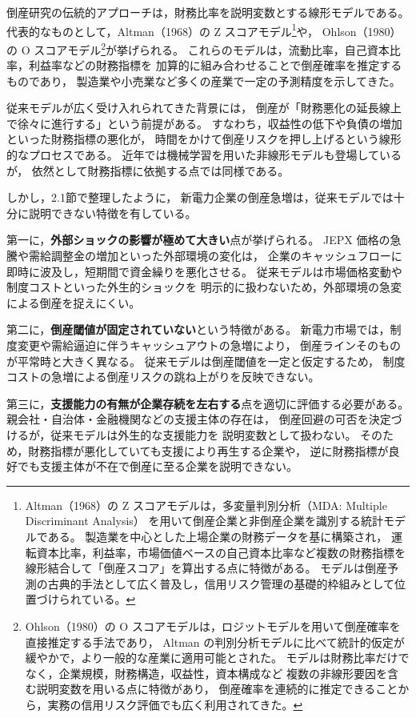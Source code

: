 倒産研究の伝統的アプローチは，財務比率を説明変数とする線形モデルである。
代表的なものとして，Altman（1968）の Z スコアモデル\footnote{
Altman（1968）の Z スコアモデルは，多変量判別分析（MDA: Multiple Discriminant Analysis）
を用いて倒産企業と非倒産企業を識別する統計モデルである。
製造業を中心とした上場企業の財務データを基に構築され，
運転資本比率，利益率，市場価値ベースの自己資本比率など複数の財務指標を
線形結合して「倒産スコア」を算出する点に特徴がある。
モデルは倒産予測の古典的手法として広く普及し，信用リスク管理の基礎的枠組みとして位置づけられている。
}や，
Ohlson（1980）の O スコアモデル\footnote{
Ohlson（1980）の O スコアモデルは，ロジットモデルを用いて倒産確率を直接推定する手法であり，
Altman の判別分析モデルに比べて統計的仮定が緩やかで，より一般的な産業に適用可能とされた。
モデルは財務比率だけでなく，企業規模，財務構造，収益性，資本構成など
複数の非線形要因を含む説明変数を用いる点に特徴があり，
倒産確率を連続的に推定できることから，実務の信用リスク評価でも広く利用されてきた。
}が挙げられる。
これらのモデルは，流動比率，自己資本比率，利益率などの財務指標を
加算的に組み合わせることで倒産確率を推定するものであり，
製造業や小売業など多くの産業で一定の予測精度を示してきた。


従来モデルが広く受け入れられてきた背景には，
倒産が「財務悪化の延長線上で徐々に進行する」という前提がある。
すなわち，収益性の低下や負債の増加といった財務指標の悪化が，
時間をかけて倒産リスクを押し上げるという線形的なプロセスである。
近年では機械学習を用いた非線形モデルも登場しているが，
依然として財務指標に依拠する点では同様である。

しかし，2.1節で整理したように，
新電力企業の倒産急増は，従来モデルでは十分に説明できない特徴を有している。

第一に，\textbf{外部ショックの影響が極めて大きい}点が挙げられる。
JEPX 価格の急騰や需給調整金の増加といった外部環境の変化は，
企業のキャッシュフローに即時に波及し，短期間で資金繰りを悪化させる。
従来モデルは市場価格変動や制度コストといった外生的ショックを
明示的に扱わないため，外部環境の急変による倒産を捉えにくい。

第二に，\textbf{倒産閾値が固定されていない}という特徴がある。
新電力市場では，制度変更や需給逼迫に伴うキャッシュアウトの急増により，
倒産ラインそのものが平常時と大きく異なる。
従来モデルは倒産閾値を一定と仮定するため，
制度コストの急増による倒産リスクの跳ね上がりを反映できない。

第三に，\textbf{支援能力の有無が企業存続を左右する}点を適切に評価する必要がある。
親会社・自治体・金融機関などの支援主体の存在は，
倒産回避の可否を決定づけるが，従来モデルは外生的な支援能力を
説明変数として扱わない。
そのため，財務指標が悪化していても支援により再生する企業や，
逆に財務指標が良好でも支援主体が不在で倒産に至る企業を説明できない。

